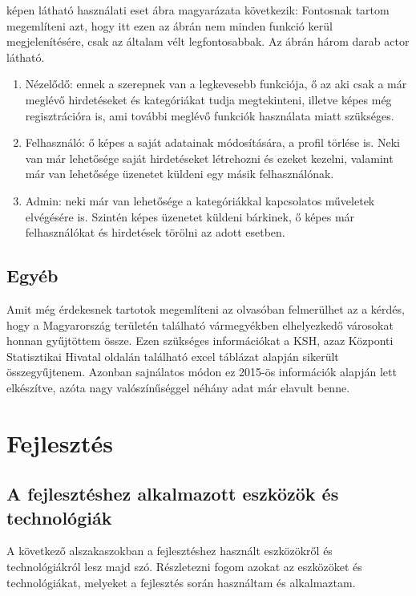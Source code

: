 \documentclass[]{thesis-ekf}
\theoremstyle{definition}
\theoremstyle{remark}
\begin{document}
	 képen látható használati eset ábra magyarázata következik:
	Fontosnak tartom megemlíteni azt, hogy itt ezen az ábrán nem minden funkció kerül megjelenítésére, csak az általam vélt  legfontosabbak. Az ábrán három darab actor látható.
	\begin{enumerate}
		\item Nézelődő: ennek a szerepnek van a legkevesebb funkciója, ő az aki csak a már meglévő hirdetéseket és kategóriákat tudja megtekinteni, illetve képes még regisztrációra is, ami további meglévő funkciók használata miatt szükséges.
		\item Felhasználó: ő képes a saját adatainak módosítására, a profil törlése is. Neki van már lehetősége saját hirdetéseket létrehozni és ezeket kezelni, valamint már van lehetősége üzenetet küldeni egy másik felhasználónak.
		\item Admin: neki már van lehetősége a kategóriákkal kapcsolatos műveletek elvégésére is. Szintén képes üzenetet küldeni bárkinek, ő képes már felhasználókat és hirdetések törölni az adott esetben.
	\end{enumerate}	
	
	\section{Egyéb}
		Amit még érdekesnek tartotok megemlíteni az olvasóban felmerülhet az a kérdés, hogy a Magyarország területén található vármegyékben elhelyezkedő városokat honnan gyűjtöttem össze. Ezen szükséges információkat a KSH, azaz Központi Statisztikai Hivatal oldalán található excel táblázat alapján sikerült összegyűjtenem. Azonban sajnálatos módon ez 2015-ös információk alapján lett elkészítve, azóta nagy valószínűséggel néhány adat már elavult benne. 

	\chapter{Fejlesztés}		
	\section{A fejlesztéshez alkalmazott eszközök és technológiák}
		A következő alszakaszokban a fejlesztéshez használt eszközökről és technológiákról lesz majd szó. Részletezni fogom azokat az eszközöket és technológiákat, melyeket a fejlesztés során használtam és alkalmaztam.
\end{document}
